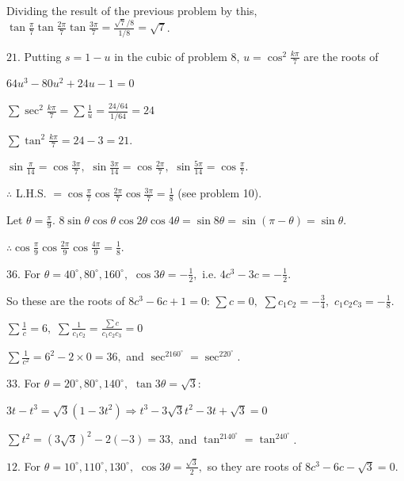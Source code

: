   Dividing the result of the previous problem by this, $\tan\frac{\pi}{7}\tan\frac{2\pi}{7}\tan\frac{3\pi}{7} =
  \frac{\sqrt{7}/8}{1/8} = \sqrt{7}$.

\item $21$. Putting $s = 1 - u$ in the cubic of problem 8, $u = \cos^2\frac{k\pi}{7}$ are the roots of

  $64u^3 - 80u^2 + 24u - 1 = 0$

  $\sum\sec^2\frac{k\pi}{7} = \sum\frac{1}{u} = \frac{24/64}{1/64} = 24$

  $\sum\tan^2\frac{k\pi}{7} = 24 - 3 = 21$.

\item $\sin\frac{\pi}{14} = \cos\frac{3\pi}{7},$ $\sin\frac{3\pi}{14} = \cos\frac{2\pi}{7},$ $\sin\frac{5\pi}{14} =
  \cos\frac{\pi}{7}$.

  $\therefore$ L.H.S. $= \cos\frac{\pi}{7}\cos\frac{2\pi}{7}\cos\frac{3\pi}{7} = \frac{1}{8}$ (see problem 10).

\item Let $\theta = \frac{\pi}{9}.$ $8\sin\theta\cos\theta\cos2\theta\cos4\theta = \sin8\theta = \sin(\pi - \theta) =
  \sin\theta$.

  $\therefore \cos\frac{\pi}{9}\cos\frac{2\pi}{9}\cos\frac{4\pi}{9} = \frac{1}{8}$.

\item $36$. For $\theta = 40^\circ, 80^\circ, 160^\circ,$ $\cos3\theta = -\frac{1}{2},$ i.e. $4c^3 - 3c = -\frac{1}{2}$.

  So these are the roots of $8c^3 - 6c + 1 = 0$: $\sum c = 0,$ $\sum c_1c_2 = -\frac{3}{4},$ $c_1c_2c_3 = -\frac{1}{8}$.

  $\sum\frac{1}{c} = 6,$ $\sum\frac{1}{c_1c_2} = \frac{\sum c}{c_1c_2c_3} = 0$

  $\sum\frac{1}{c^2} = 6^2 - 2\times0 = 36,$ and $\sec^2160^\circ = \sec^220^\circ$.

\item $33$. For $\theta = 20^\circ, 80^\circ, 140^\circ,$ $\tan3\theta = \sqrt{3}$:

  $3t - t^3 = \sqrt{3}(1 - 3t^2) \Rightarrow t^3 - 3\sqrt{3}t^2 - 3t + \sqrt{3} = 0$

  $\sum t^2 = (3\sqrt{3})^2 - 2(-3) = 33,$ and $\tan^2140^\circ = \tan^240^\circ$.

\item $12$. For $\theta = 10^\circ, 110^\circ, 130^\circ,$ $\cos3\theta = \frac{\sqrt{3}}{2},$ so they are roots of $8c^3 - 6c
  - \sqrt{3} = 0$.

